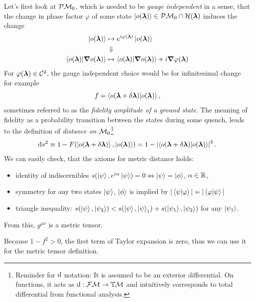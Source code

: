 Let's first look at $\mathcal{P}\mathcal{M}_0$, which is needed to be \emph{gauge independent} in a sense, that the change in phase factor $\varphi$ of some state $\ket{o({\bm\lambda})}\in \mathcal{P}\mathcal{M}_0\cap \mathcal{H}({\bm\lambda})$ induces the change 
\begin{equation}
    \begin{split}        
        \ket{o({\bm\lambda})}&\mapsto e^{i\varphi({\bm\lambda})} \ket{o({\bm\lambda})} \\
        &\,\Downarrow \\ 
        \braket{o({\bm\lambda})|\bm \nabla o({\bm\lambda})}&\mapsto \braket{o({\bm\lambda})|\bm \nabla o({\bm\lambda})} + i\bm \nabla \varphi({\bm\lambda}) 
    \end{split}
\end{equation} 
For $\varphi({\bm\lambda})\in \mathcal C^2$, the gauge independent choice would be for infinitesimal change for example
\begin{equation}
    f=\braket{o(\bm{{\bm\lambda}}+\delta\bm{{\bm\lambda}})|o(\bm{{\bm\lambda}})},
    \label{eq:fidelityDefinition}
\end{equation}
sometimes referred to as the \emph{fidelity amplitude of a ground state}. The meaning of fidelity as a probability transition between the states during some quench, leads to the definition of \emph{distance on $\mathcal{M}_0$}\footnote{Reminder for $\mathrm{d}$ notation: It is assumed to be an exterior differential. On functions, it acts as $\mathrm{d}: \mathcal{F}\mathcal{M}\rightarrow \mathbb{T}\mathcal{M}$ and intuitively corresponds to total differential from functional analysis.}
\begin{equation}
    \mathrm{d} s^2 \equiv 1-F(\ket{o(\bm{{\bm\lambda}}+\delta\bm{{\bm\lambda}})},\ket{o({\bm\lambda})})= 1-\left|\braket{o(\bm{{\bm\lambda}}+\delta\bm{{\bm\lambda}})|o(\bm{{\bm\lambda}})}\right|^2.
    \label{eq:distanceOnM0}
\end{equation}
We can easily check, that the axioms for metric distance holds:
\begin{itemize}
    \item identity of indiscernibles $s(\ket{\psi},e^{i\alpha}\ket{\psi}) = 0 \Leftrightarrow \ket{\psi}=\ket{\phi}$, $\alpha\in\mathbb{R}$,
    \item symmetry for any two states $\ket{\psi}$, $\ket{\phi}$ is implied by $|\braket{\psi|\varphi}|=|\braket{\varphi|\psi}|$
    \item triangle inequality: $s(\ket{\psi},\ket{\psi_2}) <s(\ket{\psi},\ket{\psi}_1) + s(\ket{\psi_1},\ket{\psi_2})$ for any $\ket{\psi_1}$.
\end{itemize}
From this, $g^{\mu\nu}$ is a metric tensor.

Because $1-f^2>0$, the first term of Taylor expansion is zero, thus we can use it for the metric tensor definition.

